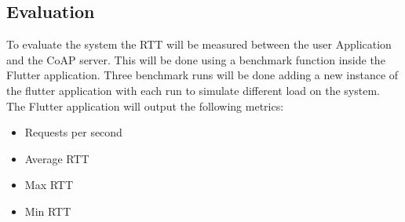 \subsection{Evaluation}
To evaluate the system the RTT will be measured between the user Application and the CoAP server. This will be done using a benchmark function inside the Flutter application. Three benchmark runs will be done adding a new instance of the flutter application with each run to simulate different load on the system. The Flutter application will output the following metrics:
\begin{itemize}
    \item Requests per second
    \item Average RTT
    \item Max RTT
    \item Min RTT
\end{itemize}
